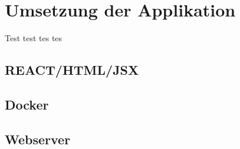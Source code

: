 \chapter{Umsetzung der Applikation}
Test test tes tes 

\section{REACT/HTML/JSX}


\section{Docker}


\section{Webserver}